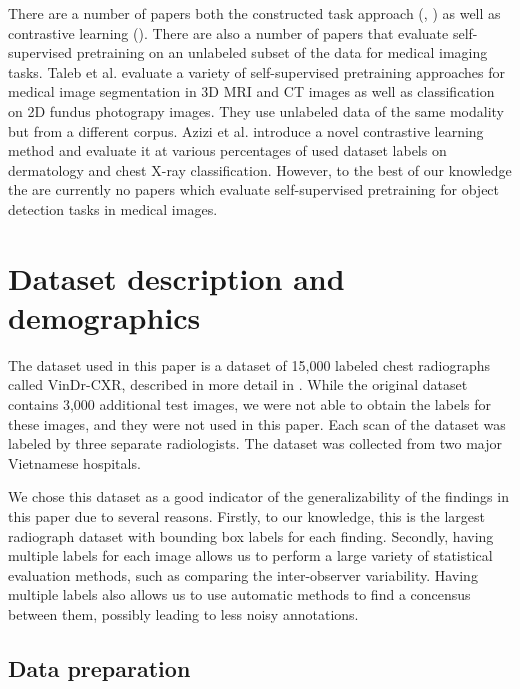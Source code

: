 \documentclass[conference]{IEEEtran}
\begin{document}
There are a number of papers both the constructed task approach 
(\cite{baiSelfSupervisedLearningCardiac2019}, \cite{ZHU2020101746}) as well as contrastive
learning (\cite{zhouComparingLearnSurpassing2020}). There are also a number of papers
that evaluate self-supervised pretraining on an unlabeled subset of the data for medical
imaging tasks. Taleb et al. \cite{NEURIPS2020_d2dc6368} evaluate a variety of 
self-supervised pretraining approaches
for medical image segmentation in 3D MRI and CT images as well as classification on 2D 
fundus photograpy images. They use unlabeled data of the same modality but from a 
different corpus. Azizi et al. \cite{aziziBigSelfSupervisedModels2021} introduce a
novel contrastive learning method and evaluate it at various percentages of used
dataset labels on dermatology and chest X-ray classification. However, to the
best of our knowledge the are currently no papers which evaluate self-supervised 
pretraining for object detection tasks in medical images.



\section{Dataset description and demographics}\label{dataset}

The dataset used in this paper is a dataset of 15,000 labeled chest radiographs called VinDr-CXR, 
described in more detail in \cite{nguyenVinDrCXROpenDataset2021}. While the original dataset 
contains 3,000 additional test images, we were not able to obtain the labels for these images, and 
they were not used in this paper. Each scan of the dataset was labeled by three separate 
radiologists.  The dataset was collected from two major Vietnamese hospitals. 

We chose this dataset as a good indicator of the generalizability of the findings in this paper 
due to several reasons. Firstly, to our knowledge, this is the largest radiograph dataset with 
bounding box labels for each finding. Secondly, having multiple labels for each image allows us to 
perform a large variety of statistical evaluation methods, such as comparing the inter-observer 
variability. Having multiple labels also allows us to use automatic methods to find a concensus 
between them, possibly leading to less noisy annotations.

\subsection{Data preparation}
\end{document}
